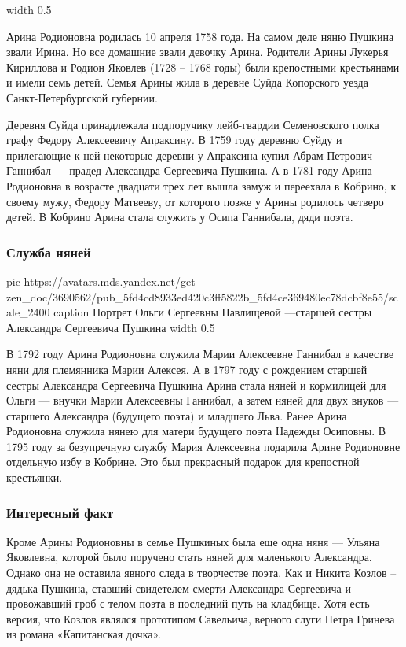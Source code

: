 \ifcmt
  width 0.5
\fi


Арина Родионовна родилась 10 апреля 1758 года. На самом деле няню Пушкина звали
Ирина. Но все домашние звали девочку Арина. Родители Арины Лукерья Кириллова и
Родион Яковлев (1728 – 1768 годы) были крепостными крестьянами и имели семь
детей. Семья Арины жила в деревне Суйда Копорского уезда Санкт-Петербургской
губернии.

Деревня Суйда принадлежала подпоручику лейб-гвардии Семеновского полка графу
Федору Алексеевичу Апраксину. В 1759 году деревню Суйду и прилегающие к ней
некоторые деревни у Апраксина купил Абрам Петрович Ганнибал — прадед Александра
Сергеевича Пушкина. А в 1781 году Арина Родионовна в возрасте двадцати трех лет
вышла замуж и переехала в Кобрино, к своему мужу, Федору Матвееву, от которого
позже у Арины родилось четверо детей. В Кобрино Арина стала служить у Осипа
Ганнибала, дяди поэта.

\subsubsection{Служба няней}

\ifcmt
  pic https://avatars.mds.yandex.net/get-zen_doc/3690562/pub_5fd4cd8933ed420c3ff5822b_5fd4ce369480ec78dcbf8e55/scale_2400
  caption Портрет Ольги Сергеевны Павлищевой —старшей сестры Александра Сергеевича Пушкина
  width 0.5
\fi

В 1792 году Арина Родионовна служила Марии Алексеевне Ганнибал в качестве няни
для племянника Марии Алексея. А в 1797 году с рождением старшей сестры
Александра Сергеевича Пушкина Арина стала няней и кормилицей для Ольги — внучки
Марии Алексеевны Ганнибал, а затем няней для двух внуков — старшего Александра
(будущего поэта) и младшего Льва. Ранее Арина Родионовна служила нянею для
матери будущего поэта Надежды Осиповны. В 1795 году за безупречную службу Мария
Алексеевна подарила Арине Родионовне отдельную избу в Кобрине. Это был
прекрасный подарок для крепостной крестьянки.

\subsubsection{Интересный факт}

Кроме Арины Родионовны в семье Пушкиных была еще одна няня — Ульяна Яковлевна,
которой было поручено стать няней для маленького Александра. Однако она не
оставила явного следа в творчестве поэта. Как и Никита Козлов – дядька Пушкина,
ставший свидетелем смерти Александра Сергеевича и провожавший гроб с телом
поэта в последний путь на кладбище. Хотя есть версия, что Козлов являлся
прототипом Савельича, верного слуги Петра Гринева из романа «Капитанская
дочка».

